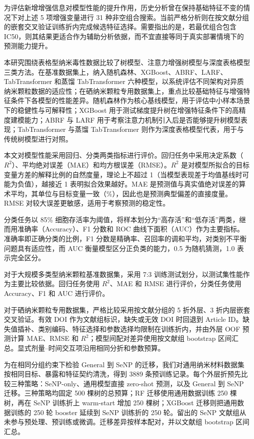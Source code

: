 为评估新增增强信息对模型性能的提升作用，历史分析曾在保持基础特征不变的情况下对上述 5 项增强变量进行 31 种非空组合搜索。当前严格分析则在按文献分组的嵌套交叉验证训练折内完成候选特征选择。需要指出的是，若最优组合包含 IC50，则其结果更适合作为辅助分析依据，而不宜直接等同于真实部署情境下的预测能力提升。

本研究围绕表格型纳米毒性数据比较了树模型、注意力增强树模型与深度表格模型三类方法。在基准数据集上，纳入随机森林、XGBoost、ABRF、LARF、TabTransformer 和蒸馏 TabTransformer 六种模型，以系统评估不同架构对异质纳米颗粒数据的适应性；在硒纳米颗粒专用数据集上，重点比较基础特征与增强特征条件下各模型的性能差异。随机森林作为核心基线模型，用于评估中小样本场景下的稳健性与可解释性；XGBoost 用于测试梯度提升树在增强特征条件下的高精度建模能力；ABRF 与 LARF 用于考察注意力机制引入后是否能够提升树模型表现；TabTransformer 与蒸馏 TabTransformer 则作为深度表格模型代表，用于与传统树模型进行对照。

本文对模型性能采用回归、分类两类指标进行评价。回归任务中采用决定系数（\(R^2\)）、平均绝对误差（MAE）和均方根误差（RMSE）。\(R^2\) 是对模型所拟合的目标变量方差的解释比例的自然度量，理论上不超过 1（当模型表现差于均值基线时可能为负值），越接近 1 表明拟合效果越好。MAE 是预测值与真实值绝对误差的算术平均，其单位与目标变量一致（\%），因此也是预测典型偏差的直接度量。RMSE 对较大误差更敏感，适用于考察预测的稳定性。

分类任务以 85\% 细胞存活率为阈值，将样本划分为“高存活”和“低存活”两类，继而用准确率（Accuracy）、F1 分数和 ROC 曲线下面积（AUC）作为主要指标。准确率即正确分类的比例，F1 分数是精确率、召回率的调和平均，对类别不平衡问题具有适应性，而 AUC 衡量模型区分正负类的能力，0.5 为随机猜测，1.0 表示完全区分。

对于大规模多类型纳米颗粒基准数据集，采用 7:3 训练测试划分，以测试集性能作为主要比较依据。回归任务使用 $R^2$、MAE 和 RMSE 进行评价，分类任务使用 Accuracy、F1 和 AUC 进行评价。

对于硒纳米颗粒专用数据集，严格比较采用按文献分组的 5 折外层、3 折内层嵌套交叉验证。有效 DOI 作为文献组标识，缺失或无效 DOI 时回退到 Article ID。缺失值插补、类别编码、特征选择和参数选择均限制在训练折内，并由外层 OOF 预测计算 MAE、RMSE 和 $R^2$；模型间配对差异使用按文献组 bootstrap 区间汇总。显式剂量--时间交互项沿用相同分折和参数预算。

为在相同分组约束下检验 General 到 SeNP 的迁移，我们对通用纳米材料数据集按相同目标、暴露和特征契约清洗，得到 3889 条预训练记录。每个外层折预先比较三种策略：SeNP-only、通用模型直接 zero-shot 预测，以及 General 到 SeNP 迁移。三种策略均固定 500 棵树的总预算；RF 迁移使用通用数据训练 250 棵树，再在 SeNP 训练折上 warm-start 增加 250 棵树；XGBoost 迁移则把通用数据训练的 250 轮 booster 延续到 SeNP 训练折的 250 轮。留出的 SeNP 文献组从未参与预处理、预训练或微调。迁移差异按样本配对，并以文献组 bootstrap 区间汇总。

